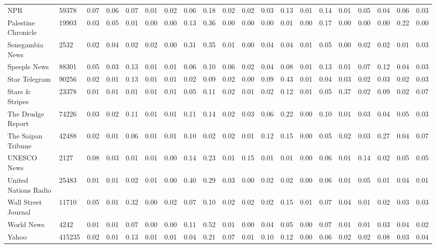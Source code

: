 \begin{landscape}
\begin{longtable}{llllllllllllllllllll}
  NPR & 59378 & 0.07 & 0.06 & 0.07 & 0.01 & 0.02 & 0.06 & 0.18 & 0.02 & 0.02 & 0.03 & 0.13 & 0.01 & 0.14 & 0.01 & 0.05 & 0.04 & 0.06 & 0.03 \\ 
  Palestine Chronicle & 19903 & 0.03 & 0.05 & 0.01 & 0.00 & 0.00 & 0.13 & 0.36 & 0.00 & 0.00 & 0.00 & 0.01 & 0.00 & 0.17 & 0.00 & 0.00 & 0.00 & 0.22 & 0.00 \\ 
  Senegambia News & 2532 & 0.02 & 0.04 & 0.02 & 0.02 & 0.00 & 0.31 & 0.35 & 0.01 & 0.00 & 0.04 & 0.04 & 0.01 & 0.05 & 0.00 & 0.02 & 0.02 & 0.01 & 0.03 \\ 
  Speeple News & 88301 & 0.05 & 0.03 & 0.13 & 0.01 & 0.01 & 0.06 & 0.10 & 0.06 & 0.02 & 0.04 & 0.08 & 0.01 & 0.13 & 0.01 & 0.07 & 0.12 & 0.04 & 0.03 \\ 
  Star Telegram & 90256 & 0.02 & 0.01 & 0.13 & 0.01 & 0.01 & 0.02 & 0.09 & 0.02 & 0.00 & 0.09 & 0.43 & 0.01 & 0.04 & 0.03 & 0.02 & 0.03 & 0.02 & 0.03 \\ 
  Stars \& Stripes & 23378 & 0.01 & 0.01 & 0.01 & 0.01 & 0.01 & 0.05 & 0.11 & 0.02 & 0.01 & 0.02 & 0.12 & 0.01 & 0.05 & 0.37 & 0.02 & 0.09 & 0.02 & 0.07 \\ 
  The Drudge Report & 74226 & 0.03 & 0.02 & 0.11 & 0.01 & 0.01 & 0.11 & 0.14 & 0.02 & 0.03 & 0.06 & 0.22 & 0.00 & 0.10 & 0.01 & 0.03 & 0.04 & 0.05 & 0.03 \\ 
  The Saipan Tribune & 42488 & 0.02 & 0.01 & 0.06 & 0.01 & 0.01 & 0.10 & 0.02 & 0.02 & 0.01 & 0.12 & 0.15 & 0.00 & 0.05 & 0.02 & 0.03 & 0.27 & 0.04 & 0.07 \\ 
  UNESCO News & 2127 & 0.08 & 0.03 & 0.01 & 0.01 & 0.00 & 0.14 & 0.23 & 0.01 & 0.15 & 0.01 & 0.01 & 0.00 & 0.06 & 0.01 & 0.14 & 0.02 & 0.05 & 0.05 \\ 
  United Nations Radio & 25483 & 0.01 & 0.01 & 0.02 & 0.01 & 0.00 & 0.40 & 0.29 & 0.03 & 0.00 & 0.02 & 0.02 & 0.00 & 0.06 & 0.01 & 0.05 & 0.01 & 0.04 & 0.01 \\ 
  Wall Street Journal & 11710 & 0.05 & 0.01 & 0.32 & 0.00 & 0.02 & 0.07 & 0.10 & 0.02 & 0.02 & 0.02 & 0.15 & 0.01 & 0.07 & 0.04 & 0.01 & 0.02 & 0.03 & 0.03 \\ 
  World News & 4242 & 0.01 & 0.01 & 0.07 & 0.00 & 0.00 & 0.11 & 0.52 & 0.01 & 0.00 & 0.04 & 0.05 & 0.00 & 0.07 & 0.01 & 0.01 & 0.03 & 0.04 & 0.02 \\ 
  Yahoo & 415235 & 0.02 & 0.01 & 0.13 & 0.01 & 0.01 & 0.04 & 0.21 & 0.07 & 0.01 & 0.10 & 0.12 & 0.00 & 0.06 & 0.02 & 0.02 & 0.08 & 0.03 & 0.04 \\ 
   \hline
\end{longtable}
\endgroup{}
\end{landscape}